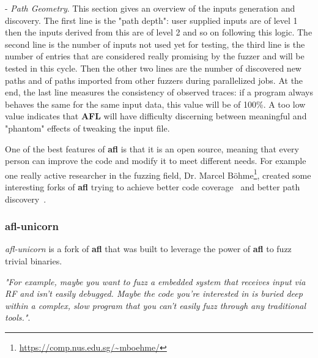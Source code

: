 \documentclass[../main.tex]{subfiles}
\begin{document}
- \textit{Path Geometry}. This section gives an overview of the inputs generation and discovery. The first line is the "path depth": user supplied inputs are of level 1 then the inputs derived from this are of level 2 and so on following this logic. The second line is the number of inputs not used yet for testing, the third line is the number of entries that are considered really promising by the fuzzer and will be tested in this cycle. Then the other two lines are the number of discovered new paths and of paths imported from other fuzzers during parallelized jobs. At the end, the last line measures the consistency of observed traces: if a program always behaves the same for the same input data, this value will be of 100\%. A too low value indicates that \textbf{AFL} will have difficulty discerning between meaningful and "phantom" effects of tweaking the input file.

\bigskip One of the best features of \textbf{\acrshort{afl}} is that it is an open source, meaning that every person can improve the code and modify it to meet different needs. For example one really active researcher in the fuzzing field, Dr. Marcel B\"ohme\footnote{\url{https://comp.nus.edu.sg/~mboehme/}}, created some interesting forks of \textbf{\acrshort{afl}} trying to achieve better code coverage~\cite{aflfast, greybf} and better path discovery~\cite{pythia}.

\subsubsection{afl-unicorn}
\label{sub:afl-unicorn}

\textit{afl-unicorn} is a fork of \textbf{\acrshort{afl}}  that was built to leverage the power of \textbf{\acrshort{afl}} to fuzz trivial binaries.

\textit{"For example, maybe you want to fuzz a embedded system that receives input via RF and isn’t easily debugged. Maybe the code you’re interested in is buried deep within a complex, slow program that you can’t easily fuzz through any traditional tools."}\cite{aflunicorn}.
\end{document}
